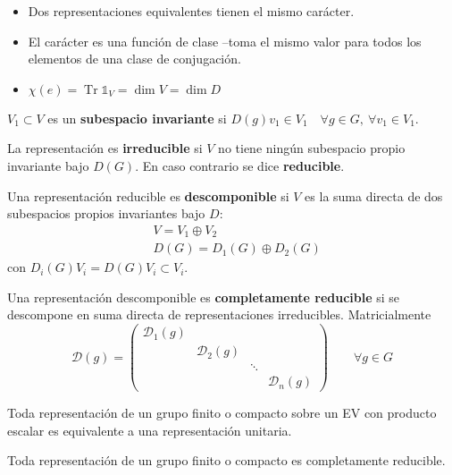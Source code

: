 \begin{itemize}
\item Dos representaciones equivalentes tienen el mismo carácter.
\item El carácter es una función de clase --toma el mismo valor para todos los elementos de una clase de conjugación.
\item $\chi(e)=\operatorname{Tr}\mathbb{1}_V=\dim V=\dim D$
\end{itemize}

\begin{definicion}
$V_1\subset V$ es un \textbf{subespacio invariante} si $D(g)v_1\in V_1\quad \forall g\in G,\ \forall v_1\in V_1$. \medskip

La representación es \textbf{irreducible} si $V$ no tiene ningún subespacio propio invariante bajo $D(G)$. En caso contrario se dice \textbf{reducible}.
\end{definicion}
\begin{definicion}
Una representación reducible es \textbf{descomponible} si $V$ es la suma directa de dos subespacios propios invariantes bajo $D$:
\begin{subequations}
\begin{flalign}
&V=V_1\oplus V_2 \\
&D(G)=D_1(G)\oplus D_2(G)
\end{flalign}
\end{subequations}
con $D_i(G)V_i=D(G)V_i\subset V_i$. \medskip

Una representación descomponible es \textbf{completamente reducible} si se descompone en suma directa de representaciones irreducibles. Matricialmente
\begin{equation}
\mathcal{D}(g)=\begin{pmatrix}
\mathcal{D}_1(g)&&\\
& \mathcal{D}_2(g)&\\
&&\ddots \\
&&& \mathcal{D}_n(g)
\end{pmatrix}\qquad \forall g\in G
\end{equation}
\end{definicion}

\begin{teorema}
Toda representación de un grupo finito o compacto sobre un EV con producto escalar es equivalente a una representación unitaria.

\end{teorema}
\begin{teorema}[Maschke]
Toda representación de un grupo finito o compacto es completamente reducible.
\end{teorema}


